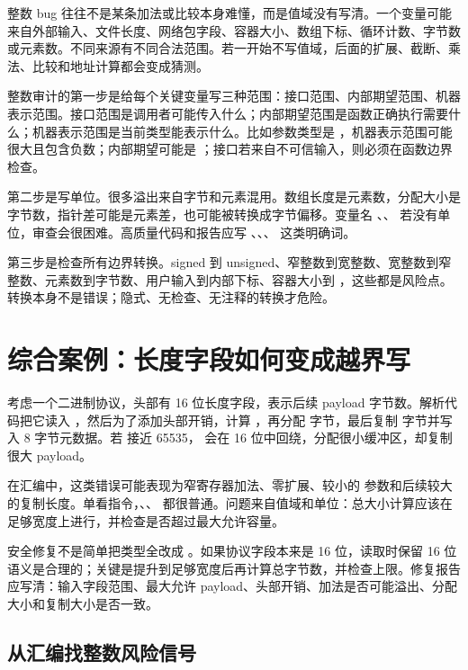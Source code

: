 整数 bug 往往不是某条加法或比较本身难懂，而是值域没有写清。一个变量可能来自外部输入、文件长度、网络包字段、容器大小、数组下标、循环计数、字节数或元素数。不同来源有不同合法范围。若一开始不写值域，后面的扩展、截断、乘法、比较和地址计算都会变成猜测。

整数审计的第一步是给每个关键变量写三种范围：接口范围、内部期望范围、机器表示范围。接口范围是调用者可能传入什么；内部期望范围是函数正确执行需要什么；机器表示范围是当前类型能表示什么。比如参数类型是 ，机器表示范围可能很大且包含负数；内部期望可能是 ；接口若来自不可信输入，则必须在函数边界检查。

第二步是写单位。很多溢出来自字节和元素混用。数组长度是元素数，分配大小是字节数，指针差可能是元素差，也可能被转换成字节偏移。变量名 、、 若没有单位，审查会很困难。高质量代码和报告应写 、、、 这类明确词。

第三步是检查所有边界转换。signed 到 unsigned、窄整数到宽整数、宽整数到窄整数、元素数到字节数、用户输入到内部下标、容器大小到 ，这些都是风险点。转换本身不是错误；隐式、无检查、无注释的转换才危险。

\section{综合案例：长度字段如何变成越界写}

考虑一个二进制协议，头部有 16 位长度字段，表示后续 payload 字节数。解析代码把它读入 ，然后为了添加头部开销，计算 ，再分配  字节，最后复制  字节并写入 8 字节元数据。若  接近 65535， 会在 16 位中回绕，分配很小缓冲区，却复制很大 payload。

在汇编中，这类错误可能表现为窄寄存器加法、零扩展、较小的  参数和后续较大的复制长度。单看指令，、、 都很普通。问题来自值域和单位：总大小计算应该在足够宽度上进行，并检查是否超过最大允许容量。

安全修复不是简单把类型全改成 。如果协议字段本来是 16 位，读取时保留 16 位语义是合理的；关键是提升到足够宽度后再计算总字节数，并检查上限。修复报告应写清：输入字段范围、最大允许 payload、头部开销、加法是否可能溢出、分配大小和复制大小是否一致。

\subsection{从汇编找整数风险信号}


